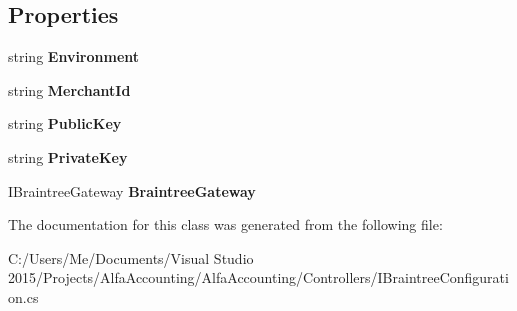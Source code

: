 \subsection*{Properties}
\begin{DoxyCompactItemize}
\item 
\mbox{\label{class_alfa_accounting_1_1_controllers_1_1_braintree_configuration_ab8785a45b4762413431f38d7f054184e}} 
string {\bfseries Environment}
\item 
\mbox{\label{class_alfa_accounting_1_1_controllers_1_1_braintree_configuration_adadf21196bb084aa94cfa1ceeb494139}} 
string {\bfseries Merchant\+Id}
\item 
\mbox{\label{class_alfa_accounting_1_1_controllers_1_1_braintree_configuration_a6688301e460de99466773e57c6597c76}} 
string {\bfseries Public\+Key}
\item 
\mbox{\label{class_alfa_accounting_1_1_controllers_1_1_braintree_configuration_ac17749d67327fac6b31d9fe551cf5bf0}} 
string {\bfseries Private\+Key}
\item 
\mbox{\label{class_alfa_accounting_1_1_controllers_1_1_braintree_configuration_a03f1bbda65764ae55a45068b90a170d7}} 
I\+Braintree\+Gateway {\bfseries Braintree\+Gateway}
\end{DoxyCompactItemize}


The documentation for this class was generated from the following file\+:\begin{DoxyCompactItemize}
\item 
C\+:/\+Users/\+Me/\+Documents/\+Visual Studio 2015/\+Projects/\+Alfa\+Accounting/\+Alfa\+Accounting/\+Controllers/I\+Braintree\+Configuration.\+cs\end{DoxyCompactItemize}
